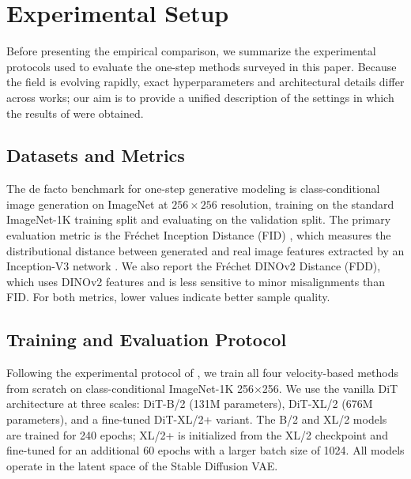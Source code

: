 \section{Experimental Setup}
\label{sec:experiments}

Before presenting the empirical comparison, we summarize the experimental protocols used to evaluate the one-step methods surveyed in this paper. Because the field is evolving rapidly, exact hyperparameters and architectural details differ across works; our aim is to provide a unified description of the settings in which the results of  were obtained.

\subsection{Datasets and Metrics}

The de facto benchmark for one-step generative modeling is class-conditional image generation on ImageNet \citep{deng2009imagenet} at $256\times256$ resolution, training on the standard ImageNet-1K training split and evaluating on the validation split. The primary evaluation metric is the Fréchet Inception Distance (FID) \citep{heusel2017gans}, which measures the distributional distance between generated and real image features extracted by an Inception-V3 network \citep{szegedy2016rethinking}. We also report the Fréchet DINOv2 Distance (FDD), which uses DINOv2 features and is less sensitive to minor misalignments than FID. For both metrics, lower values indicate better sample quality.


\subsection{Training and Evaluation Protocol}

Following the experimental protocol of \citet{zhang2025alphaflow}, we train all four velocity-based methods from scratch on class-conditional ImageNet-1K 256$\times$256. We use the vanilla DiT architecture at three scales: DiT-B/2 (131M parameters), DiT-XL/2 (676M parameters), and a fine-tuned DiT-XL/2+ variant. The B/2 and XL/2 models are trained for 240 epochs; XL/2+ is initialized from the XL/2 checkpoint and fine-tuned for an additional 60 epochs with a larger batch size of 1024. All models operate in the latent space of the Stable Diffusion VAE.

